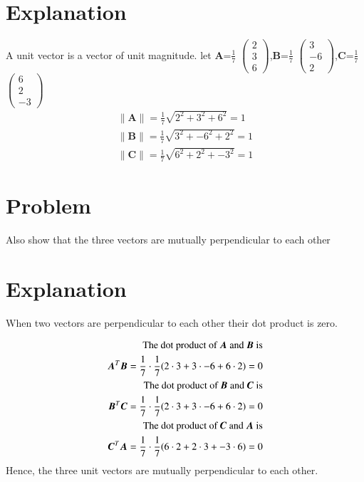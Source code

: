 \documentclass[journal,12pt,twocolumn]{IEEEtran}
\newcommand{\norm}[1]{\| #1 \|}
\begin{document}
\section{Explanation}
A unit vector is a vector of unit magnitude.
\vspace{0.5cm} let $\bm{A}$=\(\frac{1}{7}\) $\begin{pmatrix}2 \\3 \\6\end{pmatrix}$,$\bm{B}$=\(\frac{1}{7}\) $\begin{pmatrix}3 \\-6 \\2\end{pmatrix}$,$\bm{C}$=\(\frac{1}{7}\) $\begin{pmatrix}6 \\2 \\-3\end{pmatrix}$\\
\begin{align}
    \norm{\bm{A}}=\frac{1}{7}\sqrt{2^2+3^2+6^2}=1\\
    \norm{\bm{B}}=\frac{1}{7}\sqrt{3^2+-6^2+2^2}=1\\
    \norm{\bm{C}}=\frac{1}{7}\sqrt{6^2+2^2+-3^2}=1
\end{align}
\section{Problem}
Also show that the three vectors are mutually perpendicular to each other
\section{Explanation}
When two vectors are perpendicular to each other their dot product is zero.
\par
\begin{align}
\text{The dot product of $\bm{A}$ and $\bm{B}$ is}\notag\\
\bm{A}^T\bm{B}=\frac{1}{7}\cdot\frac{1}{7}(2\cdot3+3\cdot-6+6\cdot2)=0\\
\text{The dot product of $\bm{B}$ and $\bm{C}$ is} \notag\\
\bm{B}^T\bm{C}=\frac{1}{7}\cdot\frac{1}{7}(2\cdot3+3\cdot-6+6\cdot2)=0\\
\text{The dot product of $\bm{C}$ and $\bm{A}$ is} \notag\\
\bm{C}^T\bm{A}=\frac{1}{7}\cdot\frac{1}{7}(6\cdot2+2\cdot3+-3\cdot6)=0
\end{align}
Hence, the three unit vectors are mutually perpendicular to each other.
\end{document}
